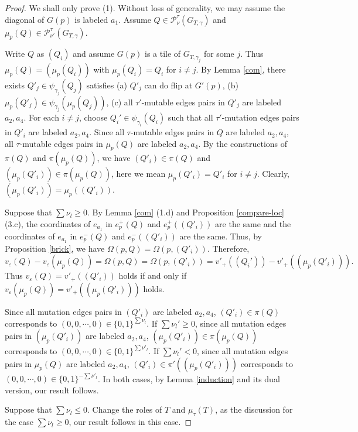 \documentclass[10pt]{amsart}
\theoremstyle{theorems}
\begin{document}
\begin{proof}

We shall only prove (1). Without loss of generality, we may assume the diagonal of $G(p)$ is labeled $a_1$. Assume $Q\in \mathcal P^{\tau}_{\nu}(G_{T,\gamma})$ and $\mu_p(Q)\in \mathcal P^{\tau}_{\nu'}(G_{T,\gamma})$.

Write $Q$ as $(Q_i)$ and assume $G(p)$ is a tile of $G_{T,\gamma_j}$ for some $j$. Thus $\mu_p(Q)=(\mu_p(Q_i))$ with $\mu_p(Q_i)=Q_i$ for $i\neq j$. By Lemma \ref{com}, there exists $Q'_j\in \psi_{\gamma_j}(Q_j)$ satisfies (a) $Q'_j$ can do flip at $G'(p)$, (b) $\mu_p(Q'_j)\in \psi_{\gamma_j}(\mu_p(Q_j))$, (c) all $\tau'$-mutable edges pairs in $Q'_j$ are labeled $a_{2},a_{4}$. For each $i\neq j$, choose $Q_i'\in \psi_{\gamma_i}(Q_i)$ such that all $\tau'$-mutation edges pairs in $Q'_i$ are labeled $a_2,a_4$. Since all $\tau$-mutable edges pairs in $Q$ are labeled $a_{2},a_{4}$, all $\tau$-mutable edges pairs in $\mu_p(Q)$ are labeled $a_{2},a_{4}$. By the constructions of $\pi(Q)$ and $\pi(\mu_p(Q))$, we have $(Q'_i)\in \pi(Q)$ and $(\mu_p(Q'_i))\in \pi(\mu_p(Q))$, here we mean $\mu_p(Q'_i)=Q'_i$ for $i\neq j$. Clearly, $(\mu_p(Q'_i))=\mu_p((Q'_i))$.

Suppose that $\sum\nu_l\geq 0$. By Lemma \ref{com} (1.d) and Proposition \ref{compare-loc} (3.c), the coordinates of $e_{a_1}$ in $e^{+}_{p}(Q)$ and $e^{+}_{p}((Q'_i))$ are the same and the coordinates of $e_{a_1}$ in $e^{-}_{p}(Q)$ and $e^{-}_{p}((Q'_i))$ are the same. Thus, by Proposition \ref{brick}, we have $\Omega(p,Q)=\Omega(p,(Q'_i))$. Therefore,
$$v_{\varepsilon}(Q)-v_{\varepsilon}(\mu_{p}(Q))=\Omega(p,Q)=\Omega(p,(Q'_i))=v'_{+}((Q_i'))-v'_{+}((\mu_p(Q'_i))).$$
Thus $v_{\varepsilon}(Q)=v'_{+}((Q'_i))$ holds if and only if $v_{\varepsilon}(\mu_{p}(Q))=v'_{+}((\mu_p(Q'_i)))$ holds.

Since all mutation edges pairs in $(Q'_i)$ are labeled $a_2,a_4$, $(Q'_i)\in \pi(Q)$ corresponds to $(0,0,\cdots,0)\in \{0,1\}^{\sum\nu_l}$. If $\sum\nu_l'\geq 0$, since all mutation edges pairs in $(\mu_p(Q'_i))$ are labeled $a_2,a_4$, $(\mu_{p}(Q'_i))\in \pi(\mu_{p}(Q))$ corresponds to $(0,0,\cdots,0)\in \{0,1\}^{\sum\nu'_l}$. If $\sum\nu_l'< 0$, since all mutation edges pairs in $\mu_p(Q)$ are labeled $a_2,a_4$, $(Q'_i)\in \pi'((\mu_{p}(Q'_i)))$ corresponds to $(0,0,\cdots,0)\in \{0,1\}^{-\sum\nu'_l}$. In both cases, by Lemma \ref{induction} and its dual version, our result follows.

Suppose that $\sum\nu_l\leq 0$. Change the roles of $T$ and $\mu_{\tau}(T)$, as the discussion for the case $\sum\nu_l\geq 0$, our result follows in this case.
\end{proof}
\end{document}
